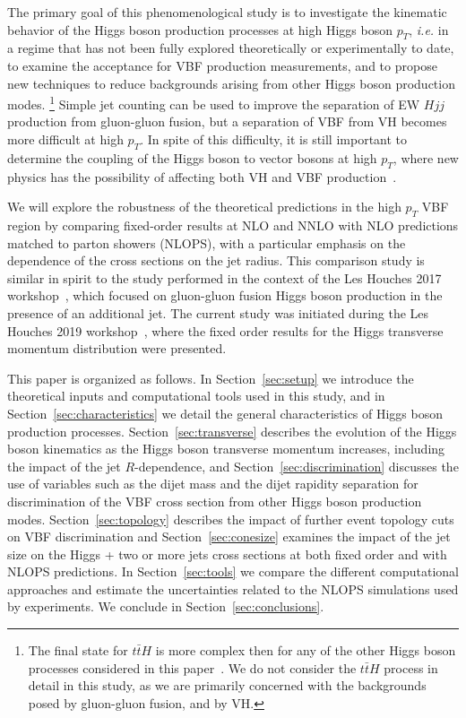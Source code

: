 \documentclass[10pt,prd,fleqn,superscriptaddress,notitlepage,nofootinbib,preprintnumbers,nobalancelastpage]{revtex4-1}
\newcommand{\VBF}{VBF\xspace}
\newcommand{\VH}{VH\xspace}
\begin{document}
The primary goal of this phenomenological study is to investigate the kinematic behavior of the Higgs boson production processes at high Higgs boson $p_T$, \emph{i.e.} in  a regime that has not been fully explored theoretically or experimentally to date, to examine the acceptance for  \VBF production measurements, and to propose new techniques to reduce backgrounds arising from other Higgs boson production modes.%
\footnote{The final state for $t\bar{t}H$ is more complex then for any of the other Higgs boson processes considered in this paper~\cite{ATLAS:2018mme,CMS:2018uxb}. We do not consider the $t\bar{t}H$ process in detail in this study, as we are primarily concerned with the backgrounds posed by gluon-gluon fusion, and by \VH.  } Simple jet counting can be used to improve the separation of  EW $Hjj$ production from gluon-gluon fusion, but a separation of \VBF from \VH becomes more difficult at high $p_T$.
In spite of this difficulty, it is still important to determine the coupling of the Higgs boson to vector bosons at high $p_T$, where new physics has the possibility of affecting both \VH and \VBF production~\cite{Araz:2020zyh}.

We will explore the robustness of the theoretical predictions in the high $p_T$ VBF region by comparing fixed-order results at NLO and NNLO with NLO predictions matched to parton showers (NLOPS), with a particular emphasis on the dependence of the cross sections on the jet radius. This comparison study is similar in spirit to the study performed in the context of the Les Houches 2017 workshop~\cite{Bellm:2019yyh}, which focused on gluon-gluon fusion Higgs boson production in the presence of an additional jet. The current study was initiated during the Les Houches 2019 workshop~\cite{Amoroso:2020lgh}, where the fixed order results for the Higgs transverse momentum distribution were presented. 

This paper is organized as follows. In Section~\ref{sec:setup} we introduce the theoretical inputs and computational tools used in this study, and in Section~\ref{sec:characteristics} we detail the general characteristics of Higgs boson production processes. Section~\ref{sec:transverse} describes the evolution of the Higgs boson kinematics as the Higgs boson transverse momentum increases, including the impact of the jet $R$-dependence, and Section~\ref{sec:discrimination} discusses the use of variables such as the dijet mass and the dijet rapidity separation for discrimination of the \VBF cross section from other Higgs boson production modes. Section~\ref{sec:topology} describes the impact of further event topology cuts on \VBF discrimination and Section~\ref{sec:conesize} examines the impact of the jet size on the Higgs + two or more jets cross sections at both fixed order and with NLOPS predictions. In Section~\ref{sec:tools} we compare the different computational approaches and estimate the uncertainties related to the NLOPS simulations used by experiments. We conclude in Section~\ref{sec:conclusions}.
\end{document}
